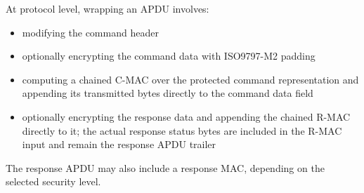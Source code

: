 At protocol level, wrapping an APDU involves:
\begin{itemize}
\item modifying the command header
\item optionally encrypting the command data with ISO9797-M2 padding
\item computing a chained C-MAC over the protected command representation and
      appending its transmitted bytes directly to the command data field
\item optionally encrypting the response data and appending the chained R-MAC
      directly to it; the actual response status bytes are included in the
      R-MAC input and remain the response APDU trailer
\end{itemize}

The response APDU may also include a response MAC, depending on the selected
security level.

